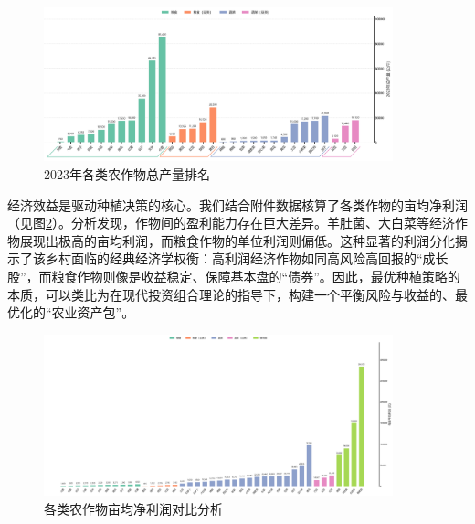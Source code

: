 \begin{figure}[h]
	\centering
	\includegraphics[width=0.9\textwidth]{../figures/0_2.png}
	\caption{2023年各类农作物总产量排名}
	\label{fig:production_rank}
\end{figure}


经济效益是驱动种植决策的核心。我们结合附件数据核算了各类作物的亩均净利润（见图\ref{fig:profit_per_mu}）。分析发现，作物间的盈利能力存在巨大差异。羊肚菌、大白菜等经济作物展现出极高的亩均利润，而粮食作物的单位利润则偏低。这种显著的利润分化揭示了该乡村面临的经典经济学权衡：高利润经济作物如同高风险高回报的“成长股”，而粮食作物则像是收益稳定、保障基本盘的“债券”。因此，最优种植策略的本质，可以类比为在现代投资组合理论的指导下，构建一个平衡风险与收益的、最优化的“农业资产包”。

\begin{figure}[htbp]
	\centering
	\includegraphics[width=0.9\textwidth]{../figures/0_3.png}
	\caption{各类农作物亩均净利润对比分析}
	\label{fig:profit_per_mu}
\end{figure}